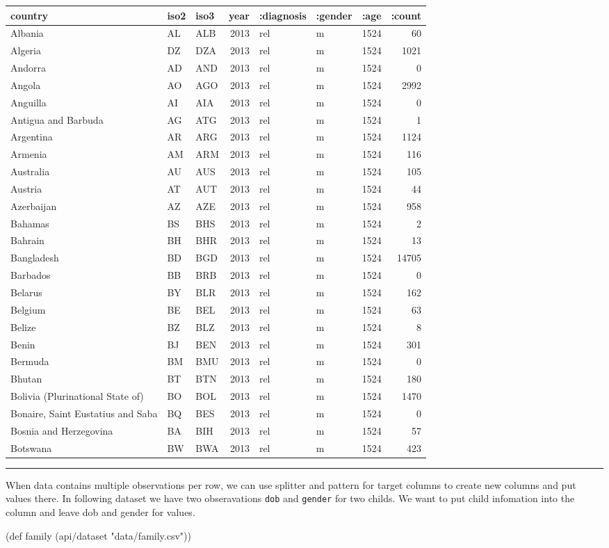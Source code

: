 \documentclass[]{article}
\newenvironment{Shaded}{\begin{snugshade}}{\end{snugshade}}
\newcommand{\StringTok}[1]{\textcolor[rgb]{0.31,0.60,0.02}{#1}}
\newcommand{\FunctionTok}[1]{\textcolor[rgb]{0.00,0.00,0.00}{#1}}
\newcommand{\BuiltInTok}[1]{#1}
\newcommand{\NormalTok}[1]{#1}
\begin{document}
\begin{longtable}[]{@{}lllrllrr@{}}
\toprule
country & iso2 & iso3 & year & :diagnosis & :gender & :age &
:count\tabularnewline
\midrule
\endhead
Albania & AL & ALB & 2013 & rel & m & 1524 & 60\tabularnewline
Algeria & DZ & DZA & 2013 & rel & m & 1524 & 1021\tabularnewline
Andorra & AD & AND & 2013 & rel & m & 1524 & 0\tabularnewline
Angola & AO & AGO & 2013 & rel & m & 1524 & 2992\tabularnewline
Anguilla & AI & AIA & 2013 & rel & m & 1524 & 0\tabularnewline
Antigua and Barbuda & AG & ATG & 2013 & rel & m & 1524 &
1\tabularnewline
Argentina & AR & ARG & 2013 & rel & m & 1524 & 1124\tabularnewline
Armenia & AM & ARM & 2013 & rel & m & 1524 & 116\tabularnewline
Australia & AU & AUS & 2013 & rel & m & 1524 & 105\tabularnewline
Austria & AT & AUT & 2013 & rel & m & 1524 & 44\tabularnewline
Azerbaijan & AZ & AZE & 2013 & rel & m & 1524 & 958\tabularnewline
Bahamas & BS & BHS & 2013 & rel & m & 1524 & 2\tabularnewline
Bahrain & BH & BHR & 2013 & rel & m & 1524 & 13\tabularnewline
Bangladesh & BD & BGD & 2013 & rel & m & 1524 & 14705\tabularnewline
Barbados & BB & BRB & 2013 & rel & m & 1524 & 0\tabularnewline
Belarus & BY & BLR & 2013 & rel & m & 1524 & 162\tabularnewline
Belgium & BE & BEL & 2013 & rel & m & 1524 & 63\tabularnewline
Belize & BZ & BLZ & 2013 & rel & m & 1524 & 8\tabularnewline
Benin & BJ & BEN & 2013 & rel & m & 1524 & 301\tabularnewline
Bermuda & BM & BMU & 2013 & rel & m & 1524 & 0\tabularnewline
Bhutan & BT & BTN & 2013 & rel & m & 1524 & 180\tabularnewline
Bolivia (Plurinational State of) & BO & BOL & 2013 & rel & m & 1524 &
1470\tabularnewline
Bonaire, Saint Eustatius and Saba & BQ & BES & 2013 & rel & m & 1524 &
0\tabularnewline
Bosnia and Herzegovina & BA & BIH & 2013 & rel & m & 1524 &
57\tabularnewline
Botswana & BW & BWA & 2013 & rel & m & 1524 & 423\tabularnewline
\bottomrule
\end{longtable}

\begin{center}\rule{0.5\linewidth}{0.5pt}\end{center}

When data contains multiple observations per row, we can use splitter
and pattern for target columns to create new columns and put values
there. In following dataset we have two obseravations \texttt{dob} and
\texttt{gender} for two childs. We want to put child infomation into the
column and leave dob and gender for values.

\begin{Shaded}
\begin{Highlighting}[]
\NormalTok{(}\BuiltInTok{def}\FunctionTok{ family }\NormalTok{(api/dataset }\StringTok{"data/family.csv"}\NormalTok{))}
\end{Highlighting}
\end{Shaded}
\end{document}
